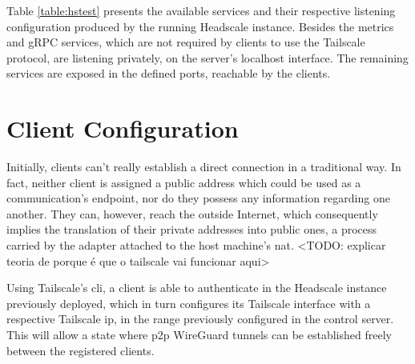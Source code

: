 \documentclass[11pt,twoside,a4paper]{report}
\begin{document}
Table \ref{table:hstest} presents the available services and their respective listening configuration produced by the running Headscale instance. Besides the metrics and gRPC services, which are not required by clients to use the Tailscale protocol, are listening privately, on the server's localhost interface. The remaining services are exposed in the defined ports, reachable by the clients.

\begin{table}[]
\centering
{}
\caption{Services running in the Headscale instance}
\label{table:hstest}
\end{table}


\section{Client Configuration}

Initially, clients can't really establish a direct connection in a traditional way. In fact, neither client is assigned a public address which could be used as a communication's endpoint, nor do they possess any information regarding one another. They can, however, reach the outside Internet, which consequently implies the translation of their private addresses into public ones, a process carried by the adapter attached to the host machine's \ac{nat}. <TODO: explicar teoria de porque é que o tailscale vai funcionar aqui>

Using Tailscale's \ac{cli}, a client is able to authenticate in the Headscale instance previously deployed, which in turn configures its Tailscale interface with a respective Tailscale \ac{ip}, in the range previously configured in the control server. This will allow a state where \ac{p2p} WireGuard tunnels can be established freely between the registered clients.
\end{document}
